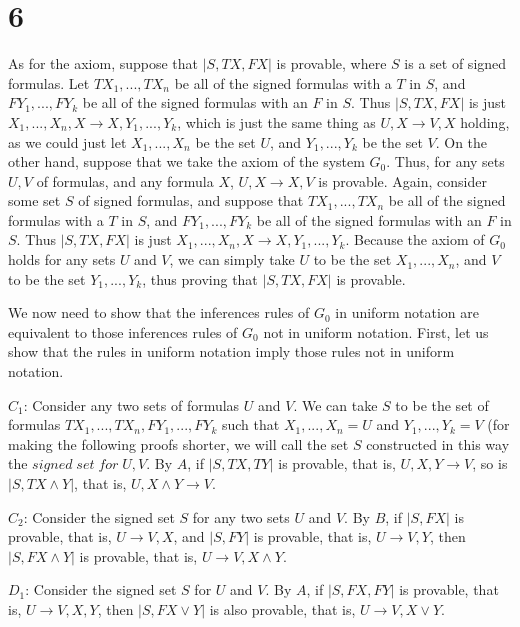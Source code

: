 \documentclass{article}
\theoremstyle{definition}
\begin{document}
\section*{6}


As for the axiom, suppose that $|S,TX,FX|$ is provable, where $S$ is a set of signed formulas. Let $TX_1,...,TX_n$ be all of the signed formulas with a $T$ in $S$, and 
$FY_1,...,FY_k$ be all of the signed formulas with an $F$ in $S$. Thus $|S,TX,FX|$ is just $X_1,...,X_n,X\rightarrow X,Y_1,...,Y_k$, which is just the same thing 
as $U,X\rightarrow V,X$ holding, as we could just let $X_1,...,X_n$ be the set $U$, and $Y_1,...,Y_k$ be the set $V$. On the other hand, suppose that we take the 
axiom of the system $G_0$. Thus, for any sets $U,V$ of formulas, and any formula $X$, $U,X\rightarrow X,V$ is provable. Again, consider some set $S$ of signed formulas, 
and suppose that $TX_1,...,TX_n$ be all of the signed formulas with a $T$ in $S$, and $FY_1,...,FY_k$ be all of the signed formulas with an $F$ in $S$. Thus $|S,TX,FX|$ 
is just $X_1,...,X_n,X\rightarrow X,Y_1,...,Y_k$. Because the axiom of $G_0$ holds for any sets $U$ and $V$, we can simply take $U$ to be the 
set $X_1,...,X_n$, and $V$ to be the set $Y_1,...,Y_k$, thus proving that $|S,TX,FX|$ is provable.


We now need to show that the inferences rules of $G_0$ in uniform notation are equivalent to those inferences rules of $G_0$ not in uniform notation. First, let us show 
that the rules in uniform notation imply those rules not in uniform notation. 


$C_1$: Consider any two sets of formulas $U$ and $V$. We can take $S$ to be the set of formulas $TX_1,...,TX_n,FY_1,...,FY_k$ such that $X_1,...,X_n=U$ and 
$Y_1,...,Y_k=V$ (for making the following proofs shorter, we will call the set $S$ constructed in this way the $signed\; set\; for\; U,V$. By $A$, if 
$|S,TX,TY|$ is provable, that is, $U,X,Y\rightarrow V$, so is $|S,TX\wedge Y|$, that is, $U,X\wedge Y\rightarrow V$.


$C_2$: Consider the signed set $S$ for any two sets $U$ and $V$. By $B$, if $|S,FX|$ is provable, that is, $U\rightarrow V,X$, and $|S,FY|$ is provable, that is, 
$U\rightarrow V,Y$, then $|S,FX\wedge Y|$ is provable, that is, $U\rightarrow V,X\wedge Y$.


$D_1$: Consider the signed set $S$ for $U$ and $V$. By $A$, if $|S,FX,FY|$ is provable, that is, $U\rightarrow V,X,Y$, then $|S,FX\vee Y|$ is also provable, that is, 
$U\rightarrow V,X\vee Y$.
\end{document}
